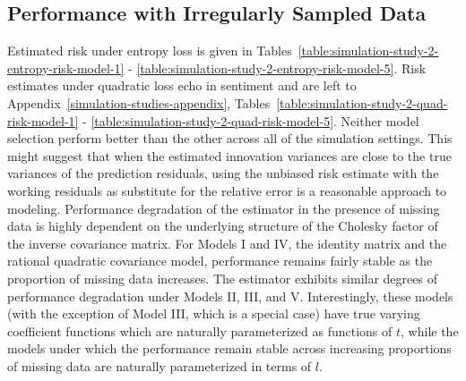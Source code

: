 %
\subsection{Performance with Irregularly Sampled Data}
%

Estimated risk under entropy loss is given in Tables~\ref{table:simulation-study-2-entropy-risk-model-1} - \ref{table:simulation-study-2-entropy-risk-model-5}.  Risk estimates under quadratic loss echo in sentiment and are left to Appendix~\ref{simulation-studies-appendix}, Tables~\ref{table:simulation-study-2-quad-risk-model-1} - \ref{table:simulation-study-2-quad-risk-model-5}. Neither model selection perform better than the other across all of the simulation settings. This might suggest that when the estimated innovation variances are close to the true variances of the prediction residuals, using the unbiased risk estimate with the working residuals as substitute for the relative error is a reasonable approach to modeling. Performance degradation of the estimator in the presence of missing data is highly dependent on the underlying structure of the Cholesky factor of the inverse covariance matrix. For Models I and IV, the identity matrix and the rational quadratic covariance model, performance remains fairly stable as the proportion of missing data increases. The estimator exhibits similar degrees of performance degradation under Models II, III, and V.  Interestingly, these models (with the exception of Model III, which is a special case) have true varying coefficient functions which are naturally parameterized as functions of $t$, while the models under which the performance remain stable across increasing proportions of missing data are naturally parameterized in terms of $l$. 

